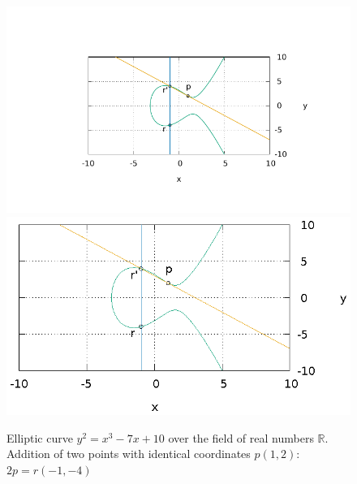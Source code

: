 \begin{figure}
\centering
\ifpdf
\includegraphics[angle=0,scale=1.5]
{./add/discretmath/picellipticsumeq2.pdf}
\else
\includegraphics[angle=0,scale=1.5]
{./add/discretmath/picellipticsumeq2.eps}
\fi
\caption{Elliptic curve $y^2 = x^3 -7 x + 10$ over the field
  of real numbers $\mathbb{R}$. Addition of two points with identical
  coordinates $p(1,2)$: $2p = r (-1,-4)$}
\label{fig:add:ellipticRsumEq2}
\end{figure}